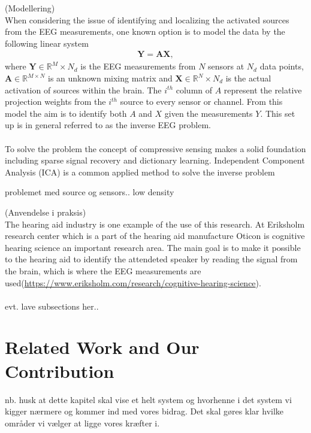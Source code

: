 (Modellering)\\
When considering the issue of identifying and localizing the activated sources from the EEG measurements, one known option is to model the data by the following linear system 
\begin{align*}
\mathbf{Y} = \mathbf{AX},
\end{align*}
where $\mathbf{Y} \in \mathbb{R}^M\times N_d$ is the EEG measurements from $N$ sensors at $N_d$ data points, $\mathbf{A} \in \mathbb{R}^{M \times N}$ is an unknown mixing matrix and $\mathbf{X} \in \mathbb{R}^N \times N_d$ is the actual activation of sources within the brain. The $i^{th}$ column of $A$ represent the relative projection weights from the $i^{th}$ source to every sensor or channel\cite{phd2015}. 
From this model the aim is to identify both $A$ and $X$ given the measurements $Y$. This set up is in general referred to as the inverse EEG problem.  \\
\\
To solve the problem the concept of compressive sensing makes a solid foundation including sparse signal recovery and dictionary learning. Independent Component Analysis (ICA) is a common applied method to solve the inverse problem   




problemet med source og sensors.. 
low density 

(Anvendelse i praksis)\\
The hearing aid industry is one example of the use of this research. At Eriksholm research center which is a part of the hearing aid manufacture Oticon is cognitive hearing science an important research area. The main goal is to make it possible to the hearing aid to identify the attendeted speaker by reading the signal from the brain, which is where the EEG measurements are used(\url{https://www.eriksholm.com/research/cognitive-hearing-science}). \\
\\


evt. lave subsections her..

\section{Related Work and Our Contribution} 





nb. husk at dette kapitel skal vise et helt system og hvorhenne i det system vi kigger nærmere og kommer ind med vores bidrag. Det skal gøres klar hvilke områder vi vælger at ligge vores kræfter i.  





 
